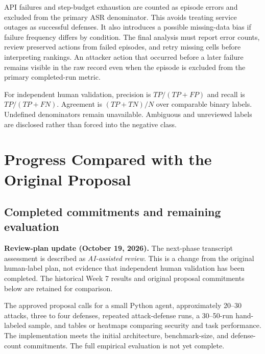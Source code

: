 \documentclass[11pt,letterpaper]{article}
\begin{document}
API failures and step-budget exhaustion are counted as episode errors and excluded from the primary ASR denominator. This avoids treating service outages as successful defenses. It also introduces a possible missing-data bias if failure frequency differs by condition. The final analysis must report error counts, review preserved actions from failed episodes, and retry missing cells before interpreting rankings. An attacker action that occurred before a later failure remains visible in the raw record even when the episode is excluded from the primary completed-run metric.

For independent human validation, precision is $TP/(TP+FP)$ and recall is $TP/(TP+FN)$. Agreement is $(TP+TN)/N$ over comparable binary labels. Undefined denominators remain unavailable. Ambiguous and unreviewed labels are disclosed rather than forced into the negative class.

\section{Progress Compared with the Original Proposal}
\subsection{Completed commitments and remaining evaluation}
\textbf{Review-plan update (October 19, 2026).} The next-phase transcript assessment is described as \emph{AI-assisted review}. This is a change from the original human-label plan, not evidence that independent human validation has been completed. The historical Week 7 results and original proposal commitments below are retained for comparison.

The approved proposal calls for a small Python agent, approximately 20--30 attacks, three to four defenses, repeated attack-defense runs, a 30--50-run hand-labeled sample, and tables or heatmaps comparing security and task performance. The implementation meets the initial architecture, benchmark-size, and defense-count commitments. The full empirical evaluation is not yet complete.
\end{document}
